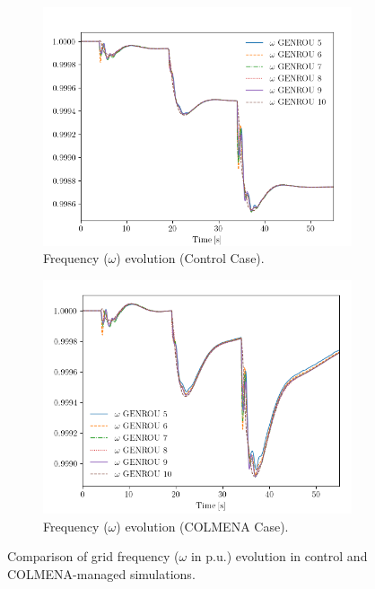 \documentclass{article}
\begin{document}
\begin{figure}[h!]
    \centering
    \begin{subfigure}[t]{0.48\textwidth}
        \centering
        \includegraphics[width=\linewidth]{plots/control_omega.png}
        \caption{Frequency ($\omega$) evolution (Control Case).}
        \label{fig:control_omega}
    \end{subfigure}
    \hfill
    \begin{subfigure}[t]{0.48\textwidth}
        \centering
        \includegraphics[width=\linewidth]{plots/colmena_omega.png}
        \caption{Frequency ($\omega$) evolution (COLMENA Case).}
        \label{fig:colmena_omega}
    \end{subfigure}
    \caption{Comparison of grid frequency ($\omega$ in p.u.) evolution in control and COLMENA-managed simulations.}
    \label{fig:omega_comparison}
\end{figure}
\end{document}
